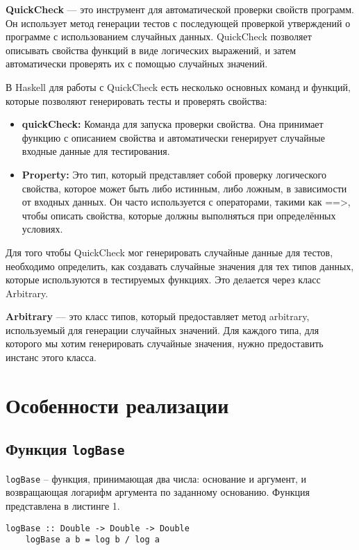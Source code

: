 \documentclass[10pt,a4paper,final]{article} %
\begin{document}
\textbf{QuickCheck} — это инструмент для автоматической проверки свойств программ. Он использует метод генерации тестов с последующей проверкой утверждений о программе с использованием случайных данных. QuickCheck позволяет описывать свойства функций в виде логических выражений, и затем автоматически проверять их с помощью случайных значений. 

В Haskell для работы с QuickCheck есть несколько основных команд и функций, которые позволяют генерировать тесты и проверять свойства:

\begin{itemize}
	\item \textbf{ quickCheck:} Команда для запуска проверки свойства. Она принимает функцию с описанием свойства и автоматически генерирует случайные входные данные для тестирования.
	\item\textbf{ Property:} Это тип, который представляет собой проверку логического свойства, которое может быть либо истинным, либо ложным, в зависимости от входных данных. Он часто используется с операторами, такими как ==>, чтобы описать свойства, которые должны выполняться при определённых условиях.
\end{itemize}

Для того чтобы QuickCheck мог генерировать случайные данные для тестов, необходимо определить, как создавать случайные значения для тех типов данных, которые используются в тестируемых функциях. Это делается через класс Arbitrary.
\par \textbf{Arbitrary} — это класс типов, который предоставляет метод arbitrary, используемый для генерации случайных значений. Для каждого типа, для которого мы хотим генерировать случайные значения, нужно предоставить инстанс этого класса.

\newpage
\section{Особенности реализации}
\subsection{Функция \texttt{logBase}}

\texttt{logBase} -- функция, принимающая два числа: основание и аргумент, и возвращающая логарифм аргумента по заданному основанию.
Функция представлена в листинге 1.

\begin{lstlisting}[caption = {Функция \texttt{logBase}}]
	logBase :: Double -> Double -> Double
	logBase a b = log b / log a
\end{lstlisting}
\end{document}
